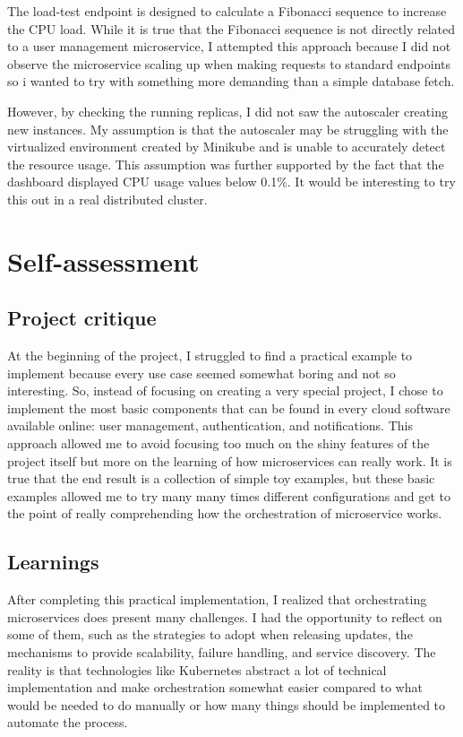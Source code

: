 \documentclass[manuscript,screen,review]{acmart}
\begin{document}
The load-test endpoint is designed to calculate a Fibonacci sequence to increase the CPU load. While it is true that the Fibonacci sequence is not directly related to a user management microservice, I attempted this approach because I did not observe the microservice scaling up when making requests to standard endpoints so i wanted to try with something more demanding than a simple database fetch.

However, by checking the running replicas, I did not saw the autoscaler creating new instances. My assumption is that the autoscaler may be struggling with the virtualized environment created by Minikube and is unable to accurately detect the resource usage. This assumption was further supported by the fact that the dashboard displayed CPU usage values below 0.1\%. It would be interesting to try this out in a real distributed cluster.

\section{Self-assessment}
\subsection{Project critique}
At the beginning of the project, I struggled to find a practical example to implement because every use case seemed somewhat boring and not so interesting. So, instead of focusing on creating a very special project, I chose to implement the most basic components that can be found in every cloud software available online: user management, authentication, and notifications. This approach allowed me to avoid focusing too much on the shiny features of the project itself but more on the learning of how microservices can really work. It is true that the end result is a collection of simple toy examples, but these basic examples allowed me to try many many times different configurations and get to the point of really comprehending how the orchestration of microservice works.

\subsection{Learnings}
After completing this practical implementation, I realized that orchestrating microservices does present many challenges. I had the opportunity to reflect on some of them, such as the strategies to adopt when releasing updates, the mechanisms to provide scalability, failure handling, and service discovery. The reality is that technologies like Kubernetes abstract a lot of technical implementation and make orchestration somewhat easier compared to what would be needed to do manually or how many things should be implemented to automate the process.
\end{document}
